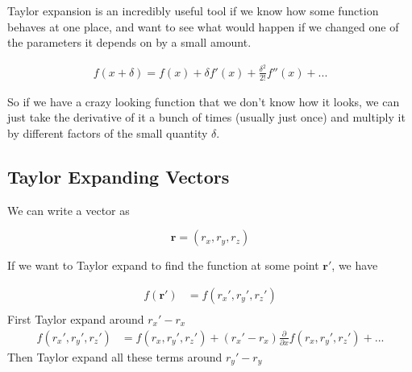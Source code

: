 Taylor expansion is an incredibly useful tool if we know how some function behaves at one place, and want to see what would happen if we changed one of the parameters it depends on by a small amount.

\begin{align}
	f(x+\delta) = f(x) + \delta f'(x) + \frac{\delta^2}{2!}f''(x) + ...
\end{align}

So if we have a crazy looking function that we don't know how it looks, we can just take the derivative of it a bunch of times (usually just once) and multiply it by different factors of the small quantity $\delta$. 

\subsection{Taylor Expanding Vectors}

We can write a vector as 

$$\textbf{r} = (r_x,r_y,r_z)$$

If we want to Taylor expand to find the function at some point $\textbf{r}'$, we have

\begin{align}
f(\textbf{r}') &= f(r_x',r_y',r_z')\\
\end{align}
First Taylor expand around $r_x'-r_x$
\begin{align}
 f(r_x',r_y',r_z') &= f(r_x,r_y',r_z') + (r_x'-r_x)\frac{\partial}{\partial x}f(r_x,r_y',r_z') + ...
\end{align}
Then Taylor expand all these terms around $r_y'-r_y$

